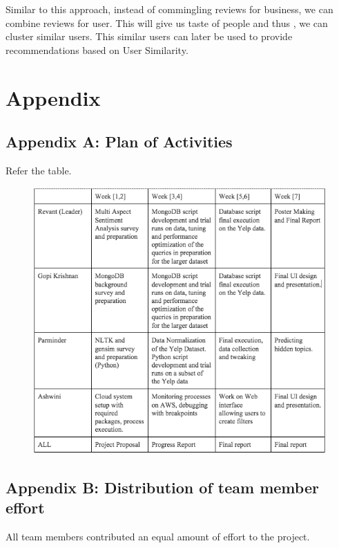 \documentclass[12pt]{article} %
\begin{document}
Similar to this approach, instead of commingling reviews for business, we can combine reviews for user. This will give us taste of people and thus , we can cluster similar users. This similar users can later be used to provide recommendations based on User Similarity.

\section{Appendix}

\subsection{Appendix A: Plan of Activities}

Refer the table.

\begin{figure}[h]
\begin{center}
\includegraphics[width=6in]{act.png}
\end{center}
\end{figure}

\subsection{Appendix B: Distribution of team member effort}

All team members contributed an equal amount of effort to the project.
\end{document}
